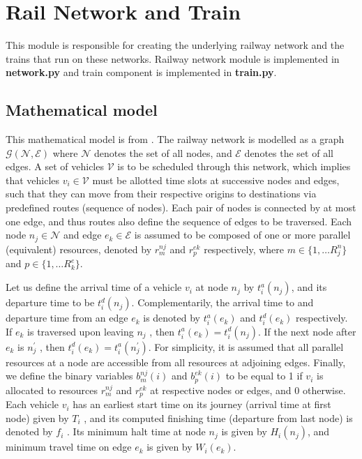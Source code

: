 \chapter{Rail Network and Train}

This module is responsible for creating the underlying railway network and the trains that run on 
these networks. Railway network module is implemented in \textbf{network.py} and train component is implemented in 
\textbf{train.py}.
\vspace{0.5cm}
\section {Mathematical model}
This mathematical model is from \cite{ARTICLE:2}. The railway network is modelled as a graph
$ \mathcal{G}( \mathcal{N} ,\mathcal{E})$ where $\mathcal{N}$ denotes the set of all nodes, and 
$\mathcal{E}$ denotes
the set of all edges. A set of vehicles $\mathcal{V}$ is to be scheduled
through this network, which implies that vehicles $v_i \in \mathcal{V}$
must be allotted time slots at successive nodes and edges,
such that they can move from their respective origins to
destinations via predefined routes (sequence of nodes). Each
pair of nodes is connected by at most one edge, and thus
routes also define the sequence of edges to be traversed.
Each node $n_j \in \mathcal{N}$ and edge $e_k \in \mathcal{E}$ is assumed to be
composed of one or more parallel (equivalent) resources,
denoted by $r_{m}^{nj}$ and $r_{p}^{ek}$ respectively, where $m \in \{1, \ldots R^{n}_{j}\}$
and $p \in \{1, \ldots R^{e}_{k}\}$.

\vspace{0.25cm}
Let us define the arrival time of a vehicle $v_i$ at node $n_j$ by
$t_{i}^{a} (n_j)$, and its departure time to be $t^{d}_{i} (n_j )$. Complementarily,
the arrival time to and departure time from an edge $e_k$ is
denoted by $t^{a}_{i} (e_k )$ and $t^{d}_{i} (e_k )$ respectively. If $e_k$ is traversed
upon leaving $n_j$ , then $t^{a}_{i}(e_k) = t^{d}_{i} (n_j )$. If the next node
after $e_k$ is $n_{j}^{'}$ , then $t^{d}_{i} (e_k ) = t^{a}_{i} (n_{j}^{'} )$. For simplicity, it is
assumed that all parallel resources at a node are accessible
from all resources at adjoining edges. Finally, we define the
binary variables $b^{nj}_{m}(i)$ and $b_{p}^{ek}(i)$ to be equal to 1 if $v_i$ is
allocated to resources $r_{m}^{nj}$ and $r_{p}^{ek}$ at respective nodes or
edges, and 0 otherwise. Each vehicle $v_i$ has an earliest start
time on its journey (arrival time at first node) given
by $T_i$ , and its computed finishing time (departure from last
node) is denoted by $f_i$ . Its minimum halt time at node $n_j$
is given by $H_i (n_j )$, and minimum travel time on edge $e_k$ is
given by $W_i (e_k )$.

